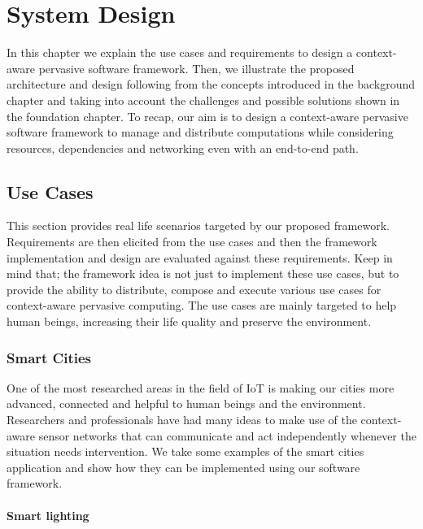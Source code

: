 
 \chapter{System Design}\label{chapter:Approach}
 In this chapter we explain the use cases and requirements to design a context-aware pervasive software framework. Then, we illustrate the  proposed architecture and design following from the concepts introduced in the background chapter and taking into account the challenges and possible solutions shown in the foundation chapter. To recap,  our aim is to design a context-aware pervasive software framework to manage and distribute computations while considering resources, dependencies and networking even with an end-to-end path.

\section{Use Cases}
This section provides real life scenarios targeted by our proposed framework. Requirements are then elicited from the use cases and then the framework implementation and design are evaluated against these requirements. Keep in mind that; the framework idea is not just to implement these use cases, but to provide the ability to distribute, compose and execute various use cases for context-aware pervasive computing. The use cases are mainly targeted to help human beings, increasing their life quality and preserve the environment. 

\subsection{Smart Cities}
One of the most researched areas in the field of IoT is making our cities more advanced, connected and helpful to human beings and the environment. Researchers and professionals have had many ideas to make use of the context-aware sensor networks that can communicate and act independently whenever the situation needs intervention. We take some examples of the smart cities application and show how they can be implemented using our software framework.

\subsubsection{Smart lighting}

